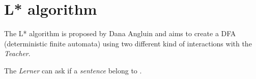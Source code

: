 \section{L* algorithm}
The L* algorithm is proposed by Dana Angluin and aims to create a DFA (deterministic finite automata) using two different kind of interactions with the \textit{Teacher}.

The \textit{Lerner} can ask if a \textit{sentence} belong to \lang{}.